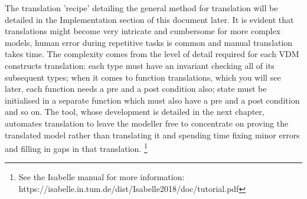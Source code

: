 The translation 'recipe' detailing the general method for translation will be detailed in the Implementation section of this document later. It is evident that translations might become very intricate and cumbersome for more complex models, human error during repetitive tasks is common and manual translation takes time. The complexity comes from the level of detail required for each VDM constructs translation: each type must have an invariant checking all of its subsequent types; when it comes to function translations, which you will see later, each function needs a pre and a post condition also; state must be initialised in a separate function which must also have a pre and a post condition and so on. The tool, whose development is detailed in the next chapter, automates translation to leave the modeller free to concentrate on proving the translated model rather than translating it and spending time fixing minor errors and filling in gaps in that translation. \footnote{See the Isabelle manual for more information: https://isabelle.in.tum.de/dist/Isabelle2018/doc/tutorial.pdf}